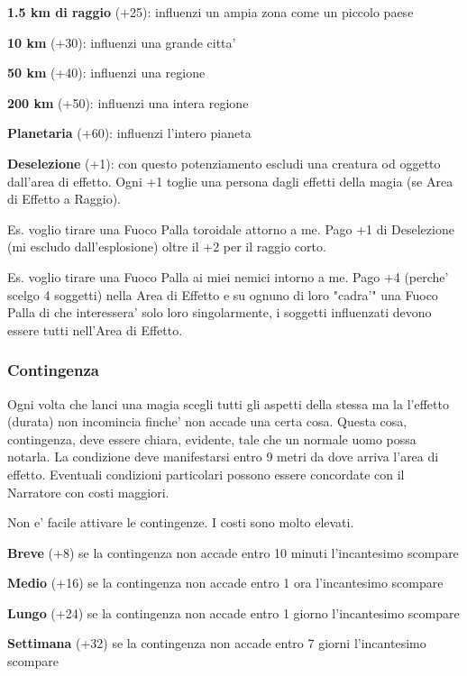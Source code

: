 \documentclass[a4paper,11pt,twoside,openany]{book}
\begin{document}
\textbf{1.5 km di raggio} (+25): influenzi un ampia zona come un piccolo paese

\textbf{10 km} (+30): influenzi una grande citta'

\textbf{50 km} (+40): influenzi una regione

\textbf{200 km} (+50): influenzi una intera regione

\textbf{Planetaria} (+60): influenzi l'intero pianeta

\textbf{Deselezione} (+1): con questo potenziamento escludi una creatura od oggetto dall'area di effetto. Ogni +1 toglie una persona dagli effetti della magia (se Area di Effetto a Raggio).

Es. voglio tirare una Fuoco Palla toroidale attorno a me. Pago +1 di Deselezione (mi escludo dall'esplosione) oltre il +2 per il raggio corto.

Es. voglio tirare una Fuoco Palla ai miei nemici intorno a me. Pago +4 (perche' scelgo 4 soggetti) nella Area di Effetto e su ognuno di loro "cadra'" una Fuoco Palla di che interessera' solo loro singolarmente, i soggetti influenzati devono essere tutti nell'Area di Effetto.

\subsubsection{Contingenza}

\label{contingenza}

Ogni volta che lanci una magia scegli tutti gli aspetti della stessa ma la l'effetto (durata) non incomincia finche' non accade una certa cosa. Questa cosa, contingenza, deve essere chiara, evidente, tale che un normale uomo possa notarla. La condizione deve manifestarsi entro 9 metri da dove arriva l'area di effetto. Eventuali condizioni particolari possono essere concordate con il Narratore con costi maggiori. 

Non e' facile attivare le contingenze. I costi sono molto elevati.

\textbf{Breve} (+8) se la contingenza non accade entro 10 minuti l'incantesimo scompare

\textbf{Medio} (+16) se la contingenza non accade entro 1 ora l'incantesimo scompare

\textbf{Lungo} (+24) se la contingenza non accade entro 1 giorno l'incantesimo scompare

\textbf{Settimana} (+32) se la contingenza non accade entro 7 giorni l'incantesimo scompare
\end{document}
